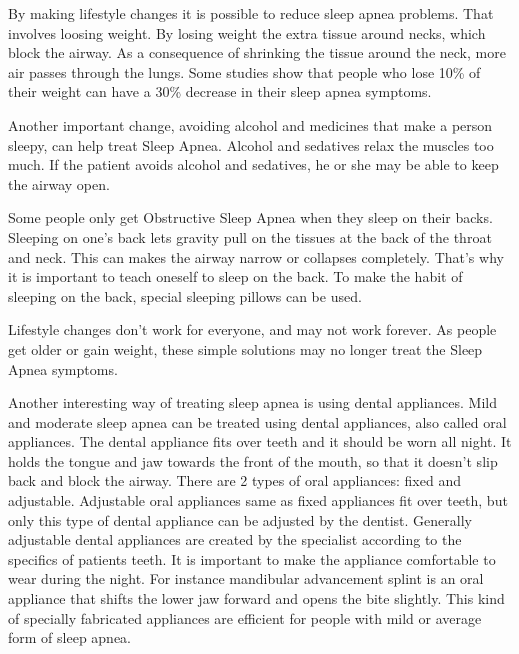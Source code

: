 By making lifestyle changes it is possible to reduce sleep apnea problems. That involves loosing weight. By losing weight the extra tissue around necks, which block the airway. As a consequence of shrinking the tissue around the neck, more air passes through the lungs. Some studies show that people who lose 10\% of their weight can have a 30\% decrease in their sleep apnea symptoms.

Another important change, avoiding alcohol and medicines that make a person sleepy, can help treat Sleep Apnea. Alcohol and sedatives relax the muscles too much. If the patient avoids alcohol and sedatives, he or she may be able to keep the airway open. 

Some people only get Obstructive Sleep Apnea when they sleep on their backs. Sleeping on one's back lets gravity pull on the tissues at the back of the throat and neck. This can makes the airway narrow or collapses completely. That's why it is important to teach oneself to sleep on the back. To make the habit of sleeping on the back, special sleeping pillows can be used.

Lifestyle changes don’t work for everyone, and may not work forever. As people get older or gain weight, these simple solutions may no longer treat the Sleep Apnea symptoms.

Another interesting way of treating sleep apnea is using dental appliances. Mild and moderate sleep apnea can be treated using dental appliances, also called oral appliances. The dental appliance fits over teeth and it should be worn all night. It holds the tongue and jaw towards the front of the mouth, so that it doesn't slip back and block the airway. There are 2 types of oral appliances: fixed and adjustable. Adjustable oral appliances same as fixed appliances fit over teeth, but only this type of dental appliance can be adjusted by the dentist. Generally adjustable dental appliances are created by the specialist according to the specifics of patients teeth. It is important to make the appliance comfortable to wear during the night. For instance mandibular advancement splint is an oral appliance that shifts the lower jaw forward and opens the bite slightly. This kind of specially fabricated appliances are efficient for people with mild or average form of sleep apnea.

